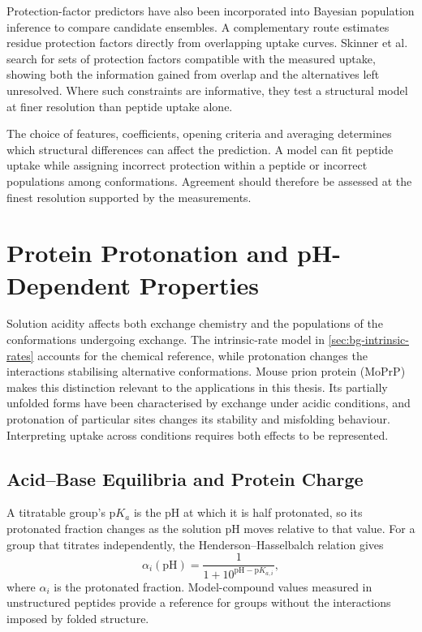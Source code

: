 Protection-factor predictors have also been incorporated into Bayesian population inference to compare candidate ensembles.\supercite{wanReconcilingSimulatedEnsembles2020} A complementary route estimates residue protection factors directly from overlapping uptake curves. Skinner et al. search for sets of protection factors compatible with the measured uptake, showing both the information gained from overlap and the alternatives left unresolved. Where such constraints are informative, they test a structural model at finer resolution than peptide uptake alone.\supercite{skinnerEstimatingConstraintsProtection2019}

The choice of features, coefficients, opening criteria and averaging determines which structural differences can affect the prediction. A model can fit peptide uptake while assigning incorrect protection within a peptide or incorrect populations among conformations.\supercite{bradshawInterpretationHDXData2020} Agreement should therefore be assessed at the finest resolution supported by the measurements.

\section{Protein Protonation and pH-Dependent Properties}
\label{sec:bg-protonation}

Solution acidity affects both exchange chemistry and the populations of the conformations undergoing exchange. The intrinsic-rate model in \cref{sec:bg-intrinsic-rates} accounts for the chemical reference, while protonation changes the interactions stabilising alternative conformations. Mouse prion protein (MoPrP) makes this distinction relevant to the applications in this thesis. Its partially unfolded forms have been characterised by exchange under acidic conditions, and protonation of particular sites changes its stability and misfolding behaviour.\supercite{moulickPartiallyUnfoldedForms2015,singhUnravelingMolecularMechanism2016} Interpreting uptake across conditions requires both effects to be represented.

\subsection{Acid--Base Equilibria and Protein Charge}
\label{sec:bg-acid-base}

A titratable group's $\mathrm{p}K_a$ is the pH at which it is half protonated, so its protonated fraction changes as the solution pH moves relative to that value. For a group that titrates independently, the Henderson--Hasselbalch relation gives
\begin{equation}
    \alpha_i(\mathrm{pH})=
    \frac{1}{1+10^{\mathrm{pH}-\mathrm{p}K_{a,i}}},
    \label{eq:bg-henderson-hasselbalch}
\end{equation}
where $\alpha_i$ is the protonated fraction. Model-compound values measured in unstructured peptides provide a reference for groups without the interactions imposed by folded structure.\supercite{thurlkillPKValuesIonizable2006}

